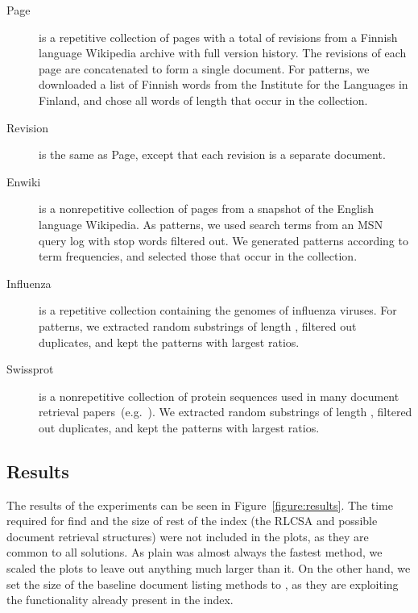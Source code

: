 \documentclass[11pt]{llncs}
\newcommand{\find}{\textsf{find}}
\newcommand{\Enwiki}{\textsf{Enwiki}}
\newcommand{\Page}{\textsf{Page}}
\newcommand{\Revision}{\textsf{Revision}}
\newcommand{\Influenza}{\textsf{Influenza}}
\newcommand{\Swissprot}{\textsf{Swissprot}}
\begin{document}
\begin{description}
\item[\Page{}] is a repetitive collection of  pages with a total of  revisions from a Finnish language Wikipedia archive with full version history. The revisions of each page are concatenated to form a single document. For patterns, we downloaded a list of Finnish words from the Institute for the Languages in Finland, and chose all words of length  that occur in the collection.

\item[\Revision{}] is the same as \Page, except that each revision is a separate document.

\item[\Enwiki{}] is a nonrepetitive collection of  pages from a snapshot of the English language Wikipedia. As patterns, we used search terms from an MSN query log with stop words filtered out. We generated  patterns according to term frequencies, and selected those that occur in the collection.

\item[\Influenza{}] is a repetitive collection containing the genomes of  influenza viruses. For patterns, we extracted  random substrings of length , filtered out duplicates, and kept the  patterns with largest  ratios.

\item[\Swissprot{}] is a nonrepetitive collection of  protein sequences used in many document retrieval papers~(e.g.~\cite{NV12}). We extracted  random substrings of length , filtered out duplicates, and kept the  patterns with largest  ratios.
\end{description}

\subsection{Results}

The results of the experiments can be seen in Figure~\ref{figure:results}. The
time required for \find{} and the size of rest of the index (the RLCSA and possible document retrieval structures) were not included in the plots, as they are common to all solutions. As plain \sada{} was almost always the fastest method, we scaled the plots to leave out anything much larger than it. On the other hand, we set the size of the baseline document listing methods to , as they are exploiting the functionality already present in the index.
\end{document}
